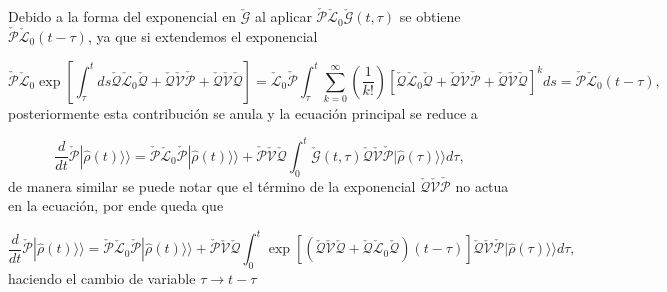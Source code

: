 \begin{appendixs}
Debido a la forma del exponencial en $\check{\mathcal{G}}$ al aplicar $\check{\mathcal{P}}\check{\mathcal{L}}_{0}\check{\mathcal{G}}(t,\tau)$ se obtiene $\check{\mathcal{P}}\check{\mathcal{L}}_{0}(t-\tau)$, ya que si extendemos el exponencial

\begin{equation*}
    \check{\mathcal{P}}\check{\mathcal{L}}_{0}\exp\left[\int_{\tau}^{t}ds\check{\mathcal{Q}}\check{\mathcal{L}}_{0}\check{\mathcal{Q}}+ \check{\mathcal{Q}}\check{\mathcal{V}}\check{\mathcal{P}}+\check{\mathcal{Q}}\check{\mathcal{V}}\check{\mathcal{Q}} \right] = \check{\mathcal{L}}_{0}\check{\mathcal{P}}\int_{\tau}^{t}\sum_{k=0}^{\infty}\left(\frac{1}{k!} \right)\left[\check{\mathcal{Q}}\check{\mathcal{L}}_{0}\check{\mathcal{Q}}+ \check{\mathcal{Q}}\check{\mathcal{V}}\check{\mathcal{P}}+\check{\mathcal{Q}}\check{\mathcal{V}}\check{\mathcal{Q}} \right]^{k}ds = \check{\mathcal{P}}\check{\mathcal{L}}_{0}(t-\tau), 
\end{equation*}
posteriormente esta contribución se anula y la ecuación principal se reduce a

\begin{equation*}
    \frac{d}{dt}\check{\mathcal{P}}|\hat{\rho}(t)\rangle \rangle = \check{\mathcal{P}}\check{\mathcal{L}}_{0}\check{\mathcal{P}}|\hat{\rho}(t)\rangle \rangle + \check{\mathcal{P}}\check{\mathcal{V}}\check{\mathcal{Q}}\int_{0}^{t}\check{\mathcal{G}}(t,\tau)\check{\mathcal{Q}}\check{\mathcal{V}} \check{\mathcal{P}}|\hat{\rho}(\tau)\rangle \rangle d\tau,        
\end{equation*}
de manera similar se puede notar que el término de la exponencial $\check{\mathcal{Q}}\check{\mathcal{V}}\check{\mathcal{P}}$ no actua en la ecuación, por ende queda que 

\begin{equation*}
    \frac{d}{dt}\check{\mathcal{P}}|\hat{\rho}(t)\rangle \rangle  = \check{\mathcal{P}}\check{\mathcal{L}}_{0}\check{\mathcal{P}}|\hat{\rho}(t)\rangle \rangle  + \check{\mathcal{P}}\check{\mathcal{V}}\check{\mathcal{Q}}\int_{0}^{t}\exp \left[\left(\check{\mathcal{Q}}\check{\mathcal{V}}\check{\mathcal{Q}} + \check{\mathcal{Q}}\check{\mathcal{L}}_{0}\check{\mathcal{Q}}\right) (t-\tau) \right]\check{\mathcal{Q}}\check{\mathcal{V}} \check{\mathcal{P}}|\hat{\rho}(\tau)\rangle \rangle d\tau,        
\end{equation*}
haciendo el cambio de variable $\tau \to t-\tau$


\end{appendixs}
